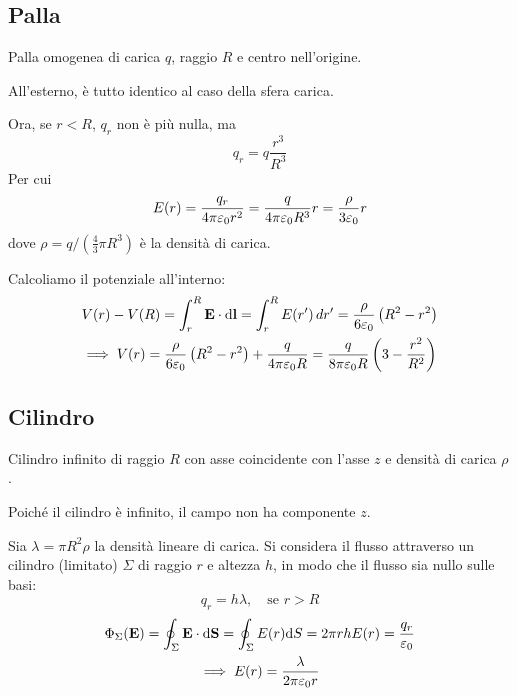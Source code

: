\subsection{Palla}

Palla omogenea di carica $q$, raggio $R$ e centro nell'origine.

All'esterno, è tutto identico al caso della sfera carica.

Ora, se $r < R$, $q_r$ non è più nulla, ma
\begin{equation}
    q_r = q \frac{r^3}{R^3}
\end{equation}
Per cui
\begin{equation}
    E(r) = \frac{q_r}{4\pi\varepsilon_0 r^2}
    = \frac{q}{4\pi\varepsilon_0 R^3} r
    = \frac{\rho}{3\varepsilon_0} r
\end{equation}
dove $\rho = q / (\frac{4}{3} \pi R^3)$ è la densità di carica.

Calcoliamo il potenziale all'interno:
\begin{equation}
\begin{gathered}
    V(r) - V(R) = \int_r^R \mathbf{E} \cdot \mathrm{d} \mathbf{l} = \int_r^R E(r') \, dr' = \frac{\rho}{6\varepsilon_0} \left( R^2 - r^2 \right) \\
    \implies V(r) = \frac{\rho}{6\varepsilon_0} \left( R^2 - r^2 \right) + \frac{q}{4\pi\varepsilon_0 R} = \frac{q}{8\pi\varepsilon_0 R} \left( 3 - \frac{r^2}{R^2} \right)
\end{gathered}
\end{equation}


\subsection{Cilindro}


Cilindro infinito di raggio $R$ con asse coincidente con l'asse $z$ e densità di carica $\rho$.

Poiché il cilindro è infinito, il campo non ha componente $z$.

Sia $\lambda = \pi R^2 \rho$ la densità lineare di carica.
Si considera il flusso attraverso un cilindro (limitato) $\Sigma$ di raggio $r$ e altezza $h$, in modo che il flusso sia nullo sulle basi:
\begin{equation}
    q_r = h \lambda, \quad \text{se } r > R
\end{equation}
\begin{equation}
\begin{gathered}
    \Phi_\Sigma(\mathbf{E}) = \oint_\Sigma \mathbf{E} \cdot \mathrm{d} \mathbf{S} = \oint_\Sigma E(r) \mathrm{d} S = 2\pi r h E(r) = \frac{q_r}{\varepsilon_0} \\
    \implies E(r) = \frac{\lambda}{2\pi\varepsilon_0 r}
\end{gathered}
\end{equation}

